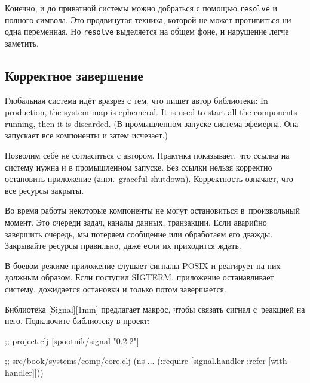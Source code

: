 Конечно, и до приватной системы можно добраться с помощью \verb|resolve| и
полного символа. Это продвинутая техника, которой не может противиться ни одна
переменная. Но \verb|resolve| выделяется на общем фоне, и нарушение легче
заметить.

\subsection{Корректное завершение}


Глобальная система идёт вразрез с тем, что пишет автор библиотеки: In
production, the system map is ephemeral. It is used to start all the components
running, then it is discarded. (В промышленном запуске система эфемерна. Она
запускает все компоненты и затем исчезает.)


Позволим себе не согласиться с автором. Практика показывает, что ссылка на
систему нужна и в промышленном запуске. Без ссылки нельзя корректно остановить
приложение (англ.~graceful shutdown). Корректность означает, что все ресурсы
закрыты.

Во время работы некоторые компоненты не могут остановиться в~произвольный
момент. Это очереди задач, каналы данных, транзакции. Если аварийно завершить
очередь, мы потеряем сообщение или обработаем его дважды. Закрывайте ресурсы
правильно, даже если их приходится ждать.


В боевом режиме приложение слушает сигналы POSIX и реагирует на них должным
образом. Если поступил SIGTERM, приложение останавливает систему, дожидается
остановки и только потом завершается.


Библиотека [Signal][1mm] предлагает макрос,
чтобы связать сигнал с~реакцией на него. Подключите библиотеку в проект:

\ifx\DEVICETYPE\MOBILE

\begin{english}
  \begin{clojure}
;; project.clj
[spootnik/signal "0.2.2"]

;; src/book/systems/comp/core.clj
(ns ...
  (:require
   [signal.handler :refer
    [with-handler]]))
  \end{clojure}
\end{english}

